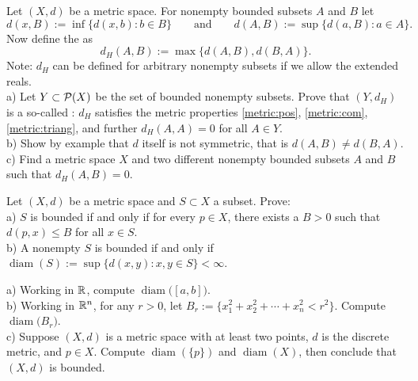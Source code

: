 \pagebreak[2]

\begin{exercise} \label{exercise:mshausdorffpseudo}
Let $(X,d)$ be a metric space.  For nonempty bounded subsets $A$ and $B$ let
\begin{equation*}
d(x,B) := \inf \{ d(x,b) : b \in B \}
\qquad \text{and} \qquad
d(A,B) := \sup \{ d(a,B) : a \in A \} .
\end{equation*}
Now define the \emph{} as
\begin{equation*}
d_H(A,B) := \max \{ d(A,B) , d(B,A) \} .
\end{equation*}
Note: $d_H$ can be defined for arbitrary nonempty subsets if we allow the
extended reals.
\\
a) Let $Y \subset {\mathcal{P}}(X)$ be the set of bounded nonempty subsets.
Prove that
$(Y,d_H)$ is a so-called \emph{}:
$d_H$ satisfies the metric properties
\ref{metric:pos},
\ref{metric:com}, 
\ref{metric:triang}, and further
$d_H(A,A) = 0$ for all $A \in Y$. 
\\
b) Show by example that $d$ itself is not symmetric, that is $d(A,B) \not=
d(B,A)$.
\\
c) Find a metric space $X$ and two different
nonempty bounded subsets $A$ and $B$ such that $d_H(A,B) = 0$.
\end{exercise}

\begin{exercise}
Let $(X,d)$ be a metric space and $S \subset X$ a subset.  Prove:\\
a)
$S$ is bounded if and only if
for every $p \in X$, there exists a $B > 0$ such that $d(p,x) \leq B$ for
all $x \in S$.\\
b)
A nonempty $S$ is bounded if and only if
$\operatorname{diam}(S) := \sup \{ d(x,y) : x,y \in S \} < \infty$.
\end{exercise}

\begin{exercise}
a)
Working in ${\mathbb{R}}$, compute $\operatorname{diam}\bigl([a,b]\bigr)$.\\
b)
Working in ${\mathbb{R}}^n$, for any $r > 0$, let $B_r := \{ x_1^2+x_2^2+\cdots+x_n^2
< r^2 \}$.  Compute $\operatorname{diam}\bigl(B_r\bigr)$.\\
c)
Suppose $(X,d)$ is a metric space with at least two points,
$d$ is the discrete metric, and $p \in X$.
Compute
$\operatorname{diam}(\{ p \})$ and $\operatorname{diam}(X)$,
then conclude that $(X,d)$ is bounded.
\end{exercise}

